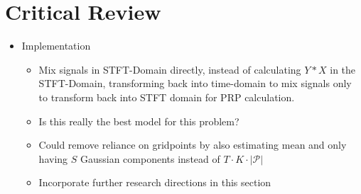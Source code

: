 \section{Critical Review}
\label{sec:critical-review}

\begin{itemize}
    \item Implementation
    \begin{itemize}
        \item Mix signals in STFT-Domain directly, instead of calculating $Y*X$ in the STFT-Domain, transforming back into time-domain to mix signals only to transform back into STFT domain for PRP calculation.
        \item Is this really the best model for this problem?
        \item Could remove reliance on gridpoints by also estimating mean and only having $S$ Gaussian components instead of $T\cdot K\cdot |\mathcal{P}|$
        \item Incorporate further research directions in this section
    \end{itemize}
\end{itemize}
